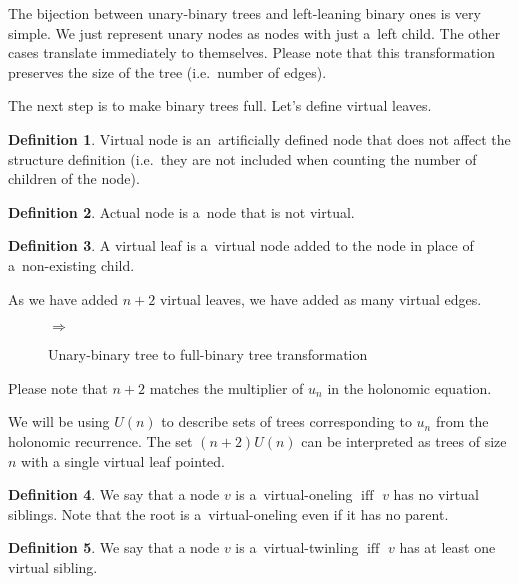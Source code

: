 \documentclass[final]{article}
\theoremstyle{definition}
\newtheorem{definition}{Definition}[subsection]
\theoremstyle{definition}
\theoremstyle{remark}
\DeclareMathOperator{\textiff}{\text{iff}}
\newcommand{\includeinlinesvg}[2]{\begin{minipage}{#1\textwidth}\end{minipage}}
\begin{document}
The bijection between unary-binary trees and left-leaning binary ones is very simple. We just represent unary nodes as nodes with just a~left child. The other cases translate immediately to themselves. Please note that this transformation preserves the size of the tree (i.e.~number of edges).

The next step is to make binary trees full. Let's define virtual leaves.

\begin{definition}
    Virtual node is an~artificially defined node that does not affect the structure definition (i.e.~they are not included when counting the number of children of the node).
\end{definition}

\begin{definition}
    Actual node is a~node that is not virtual.
\end{definition}

\begin{definition}
    A virtual leaf is a~virtual node added to the node in place of a~non-existing child.
\end{definition}

As we have added \(n + 2\) virtual leaves, we have added as many virtual edges.

\begin{figure}[H]
    \centering
    \includeinlinesvg{.2}{unary_binary__base}%
    \(\Rightarrow\)%
    \includeinlinesvg{.3}{unary_binary__full}
    \caption{Unary-binary tree to full-binary tree transformation}%
    \label{fig:unary_binary_transformation}
\end{figure}

Please note that \(n + 2\) matches the multiplier of \(u_n\) in the holonomic equation.

We will be using \(U(n)\) to describe sets of trees corresponding to \(u_n\) from the holonomic recurrence. The set \((n + 2) U(n)\) can be interpreted as trees of size \(n\) with a single virtual leaf pointed.

\begin{definition}
    We say that a node \(v\) is a~virtual-oneling \(\textiff\) \(v\) has no virtual siblings. Note that the root is a~virtual-oneling even if it has no parent.
\end{definition}

\begin{definition}
    We say that a node \(v\) is a~virtual-twinling \(\textiff\) \(v\) has at least one virtual sibling.
\end{definition}
\end{document}
